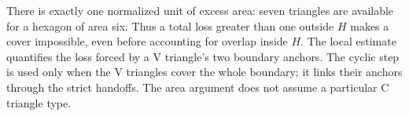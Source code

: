 There is exactly one normalized unit of excess area: seven triangles are
available for a hexagon of area six. Thus a total loss greater than one
outside $H$ makes a cover impossible, even before accounting for overlap
inside $H$. The local estimate quantifies the loss forced by a V triangle's
two boundary anchors. The cyclic step is used only when the V triangles
cover the whole boundary; it links their anchors through the strict
handoffs. The area argument does not assume a particular C triangle type.
